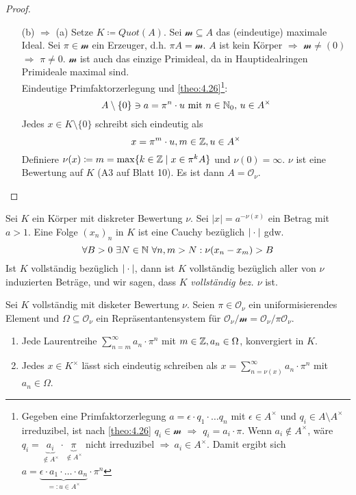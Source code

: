\documentclass[../main.tex]{subfiles}
\begin{document}
\begin{proof}
\begin{itemize}
        \item[(b) $\Rightarrow$ (a)]
        Setze $K\coloneqq Quot(A)$. Sei $\mathcal{m}\subseteq A$ das (eindeutige) maximale Ideal.
        Sei $\pi\in \mathcal{m}$ ein Erzeuger, d.h. $\pi A = \mathcal{m}$.
        $A$ ist kein Körper $\Longrightarrow$ $\mathcal{m}\neq (0)$ $\Longrightarrow$ $\pi\neq 0$.
        $\mathcal{m}$ ist auch das einzige Primideal, da in Hauptidealringen Primideale maximal sind.\\
        Eindeutige Primfaktorzerlegung und \ref{theo:4.26}\footnote{ Gegeben eine Primfaktorzerlegung $a=\epsilon\cdot q_1\cdot\dots q_n$ mit $\epsilon\in A^\times$ und $q_i\in A\setminus A^\times$ irreduzibel, ist nach \ref{theo:4.26} $q_i\in \mathcal{m}$ $\Rightarrow$ $q_i = a_i \cdot \pi$. Wenn $a_i\notin A^\times$, wäre $q_i = \underbrace{a_i}_{\notin A^\times}\cdot \underbrace{\pi}_{\notin A^\times}$ nicht irreduzibel \Lightning $\Rightarrow\ a_i\in A^\times$. Damit ergibt sich $a=\underbrace{\epsilon\cdot a_1\cdot \dots \cdot a_n}_{=:u\in A^\times} \cdot \pi^{n}$}:
        $$A\setminus\{0\} \ni a = \pi^n\cdot u\text{ mit }n\in \mathbb{N}_0\text{, }u\in A^\times$$
        Jedes $x\in K\setminus\{0\}$ schreibt sich eindeutig als
        $$x = \pi^m\cdot u,m\in \mathbb{Z}, u\in A^\times$$
        Definiere $\nu(x)\coloneqq m = \max \{k\in \mathbb{Z}\mid x\in \pi^kA\}$ und $\nu(0) = \infty$.
        $\nu$ ist eine Bewertung auf $K$ (A3 auf Blatt 10).
        Es ist dann $A=\mathcal{O}_\nu$.
    \end{itemize}
    
\end{proof}

\begin{remark}
    Sei $K$ ein Körper mit diskreter Bewertung $\nu$.
    Sei $|x| = a^{-\nu(x)}$ ein Betrag mit $a>1$.
    Eine Folge $(x_n)_n$ in $K$ ist eine Cauchy bezüglich $|\cdot|$ gdw.
    $$\forall B>0\ \exists N\in \mathbb{N}\ \forall n,m>N: \nu(x_n-x_m)>B$$
    Ist $K$ vollständig bezüglich $|\cdot|$, dann ist $K$ vollständig bezüglich aller von $\nu$ induzierten Beträge, und wir sagen, dass $K$ \emph{vollständig bez. $\nu$} ist.
\end{remark}

\begin{theorem}
    Sei $K$ vollständig mit disketer Bewertung $\nu$.
    Seien $\pi\in \mathcal{O}_\nu$ ein uniformisierendes Element und $\Omega\subseteq \mathcal{O}_\nu$ ein Repräsentantensystem für $\mathcal{O}_\nu/\mathcal{m} = \mathcal{O}_\nu/\pi \mathcal{O}_\nu$.
    \begin{enumerate}[label=(\alph*)]
        \item Jede Laurentreihe $\sum_{n=m}^\infty a_n\cdot \pi^n$ mit $m\in \mathbb{Z}, a_n\in \Omega$, konvergiert in $K$.
        \item Jedes $x\in K^\times$ lässt sich eindeutig schreiben als $x=\sum_{n = \nu(x)}^\infty a_n\cdot \pi^n$ mit $a_n\in \Omega$.
    \end{enumerate}
\end{theorem}
\end{document}
